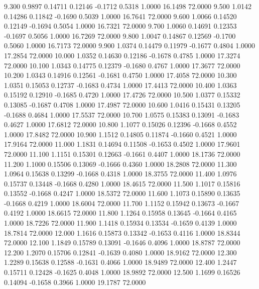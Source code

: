    9.300   0.9897   0.14711   0.12146  -0.1712   0.5318   1.0000  16.1498  72.0000
   9.500   1.0142   0.14286   0.11842  -0.1690   0.5039   1.0000  16.7641  72.0000
   9.600   1.0066   0.14520   0.12149  -0.1694   0.5054   1.0000  16.7321  72.0000
   9.700   1.0060   0.14691   0.12353  -0.1697   0.5056   1.0000  16.7269  72.0000
   9.800   1.0047   0.14867   0.12569  -0.1700   0.5060   1.0000  16.7173  72.0000
   9.900   1.0374   0.14479   0.11979  -0.1677   0.4804   1.0000  17.2854  72.0000
  10.000   1.0352   0.14630   0.12186  -0.1678   0.4785   1.0000  17.3274  72.0000
  10.100   1.0343   0.14775   0.12379  -0.1680   0.4767   1.0000  17.3677  72.0000
  10.200   1.0343   0.14916   0.12561  -0.1681   0.4750   1.0000  17.4058  72.0000
  10.300   1.0351   0.15053   0.12737  -0.1683   0.4734   1.0000  17.4413  72.0000
  10.400   1.0363   0.15192   0.12910  -0.1685   0.4720   1.0000  17.4726  72.0000
  10.500   1.0377   0.15332   0.13085  -0.1687   0.4708   1.0000  17.4987  72.0000
  10.600   1.0416   0.15431   0.13205  -0.1688   0.4684   1.0000  17.5537  72.0000
  10.700   1.0575   0.15383   0.13091  -0.1683   0.4627   1.0000  17.6812  72.0000
  10.800   1.1077   0.15026   0.12396  -0.1668   0.4552   1.0000  17.8482  72.0000
  10.900   1.1512   0.14805   0.11874  -0.1660   0.4521   1.0000  17.9164  72.0000
  11.000   1.1831   0.14694   0.11508  -0.1653   0.4502   1.0000  17.9601  72.0000
  11.100   1.1151   0.15301   0.12663  -0.1661   0.4407   1.0000  18.1736  72.0000
  11.200   1.1000   0.15506   0.13069  -0.1666   0.4360   1.0000  18.2808  72.0000
  11.300   1.0964   0.15638   0.13299  -0.1668   0.4318   1.0000  18.3755  72.0000
  11.400   1.0976   0.15737   0.13448  -0.1668   0.4280   1.0000  18.4615  72.0000
  11.500   1.1017   0.15816   0.13552  -0.1668   0.4247   1.0000  18.5372  72.0000
  11.600   1.1073   0.15890   0.13635  -0.1668   0.4219   1.0000  18.6004  72.0000
  11.700   1.1152   0.15942   0.13673  -0.1667   0.4192   1.0000  18.6615  72.0000
  11.800   1.1264   0.15958   0.13645  -0.1664   0.4165   1.0000  18.7226  72.0000
  11.900   1.1418   0.15934   0.13534  -0.1659   0.4139   1.0000  18.7814  72.0000
  12.000   1.1616   0.15873   0.13342  -0.1653   0.4116   1.0000  18.8344  72.0000
  12.100   1.1849   0.15789   0.13091  -0.1646   0.4096   1.0000  18.8787  72.0000
  12.200   1.2070   0.15706   0.12841  -0.1639   0.4080   1.0000  18.9162  72.0000
  12.300   1.2289   0.15638   0.12588  -0.1631   0.4066   1.0000  18.9489  72.0000
  12.400   1.2447   0.15711   0.12428  -0.1625   0.4048   1.0000  18.9892  72.0000
  12.500   1.1699   0.16526   0.14094  -0.1658   0.3966   1.0000  19.1787  72.0000
